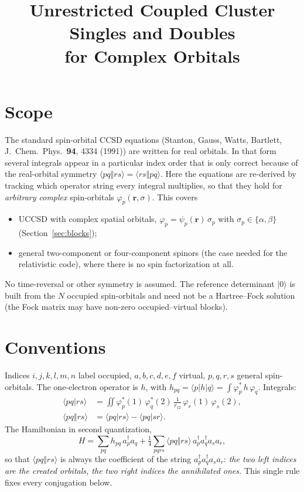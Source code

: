 \documentclass[11pt]{article}
\title{Unrestricted Coupled Cluster Singles and Doubles\\ for Complex Orbitals}
\author{}
\date{}
\newcommand{\bra}[1]{\langle #1|}
\newcommand{\ket}[1]{|#1\rangle}
\newcommand{\anti}[4]{\langle #1#2\Vert #3#4\rangle}
\newcommand{\dir}[4]{\langle #1#2|#3#4\rangle}
\begin{document}
\maketitle

\section{Scope}

The standard spin-orbital CCSD equations (Stanton, Gauss, Watts, Bartlett,
J.\ Chem.\ Phys.\ \textbf{94}, 4334 (1991)) are written for real orbitals. In
that form several integrals appear in a particular index order that is only
correct because of the real-orbital symmetry $\anti{p}{q}{r}{s}=\anti{r}{s}{p}{q}$.
Here the equations are re-derived by tracking which operator string every
integral multiplies, so that they hold for \emph{arbitrary complex}
spin-orbitals $\varphi_p(\mathbf r,\sigma)$. This covers

\begin{itemize}
\item UCCSD with complex spatial orbitals, $\varphi_p=\psi_p(\mathbf r)\,\sigma_p$ with
      $\sigma_p\in\{\alpha,\beta\}$ (Section~\ref{sec:blocks});
\item general two-component or four-component spinors (the case needed for the
      relativistic code), where there is no spin factorization at all.
\end{itemize}

No time-reversal or other symmetry is assumed. The reference determinant
$\ket{0}$ is built from the $N$ occupied spin-orbitals and need not be a
Hartree--Fock solution (the Fock matrix may have non-zero occupied--virtual
blocks).

\section{Conventions}

Indices $i,j,k,l,m,n$ label occupied, $a,b,c,d,e,f$ virtual, $p,q,r,s$ general
spin-orbitals. The one-electron operator is $h$, with
$h_{pq}=\bra{p}h\ket{q}=\int\varphi_p^*\,h\,\varphi_q$. Integrals:
\begin{align}
\dir{p}{q}{r}{s} &= \iint \varphi_p^*(1)\,\varphi_q^*(2)\,\frac{1}{r_{12}}\,\varphi_r(1)\,\varphi_s(2),\\
\anti{p}{q}{r}{s} &= \dir{p}{q}{r}{s}-\dir{p}{q}{s}{r}.
\end{align}
The Hamiltonian in second quantization,
\begin{equation}
H=\sum_{pq}h_{pq}\,a_p^\dagger a_q+\tfrac14\sum_{pqrs}\anti{p}{q}{r}{s}\,
a_p^\dagger a_q^\dagger a_s a_r ,
\end{equation}
so that $\anti{p}{q}{r}{s}$ is always the coefficient of the string
$a_p^\dagger a_q^\dagger a_s a_r$: \emph{the two left indices are the created
orbitals, the two right indices the annihilated ones.} This single rule fixes
every conjugation below.
\end{document}
